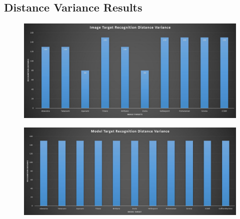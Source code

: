 \documentclass{aifyp}
\begin{document}
\begin{appendices}
\section{Distance Variance Results}
\begin{figure}[H]
    \centering
    \includegraphics[scale=0.4]{Images/Chapter6/ImageTargetDistanceVairance.JPG}
    \label{fig:ImageTargetDistanceBarchart}
\end{figure}
\begin{figure}[H]
    \centering
    \includegraphics[scale=0.4]{Images/Chapter6/ModelTargetDistanceVariance.JPG}
    \label{fig:ModelTargetDistanceBarchart}
\end{figure}

\end{appendices}
\end{document}
